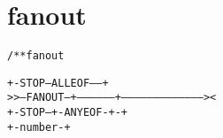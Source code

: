 \section{fanout}
\begin{shaded}
\begin{alltt}
/** fanout

               +-STOP--ALLEOF-----+
   >>--FANOUT--+------------------+---------------------------------------><
               +-STOP--+-ANYEOF-+-+
                       +-number-+

\end{alltt}
\end{shaded}

